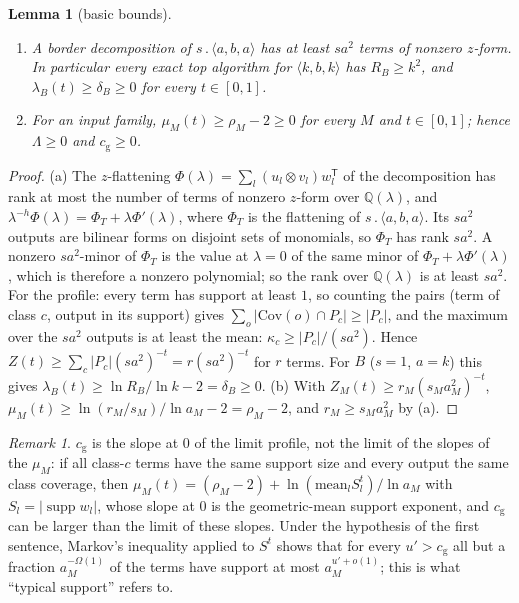 \documentclass[11pt]{article}
\newtheorem{lemma}[theorem]{Lemma}
\theoremstyle{definition}
\theoremstyle{remark}
\newtheorem{remark}[theorem]{Remark}
\providecommand{\Q}{\mathbb{Q}}
\newcommand{\abs}[1]{\lvert #1\rvert}
\DeclareMathOperator{\supp}{supp}
\newcommand{\mat}[3]{\langle #1,#2,#3\rangle} %
\newcommand{\cp}{\mathbin{.}}                 %
\newcommand{\Cov}{\mathrm{Cov}}               %
\newcommand{\lamB}{\lambda_B}                 %
\newcommand{\delB}{\delta_B}                  %
\newcommand{\RB}{R_B}                         %
\newcommand{\Lam}{\Lambda}                    %
\newcommand{\cg}{c_{\mathrm g}}               %
\begin{document}
\begin{lemma}[basic bounds]\label{cp:T1:basic}
\begin{enumerate}[label=(\alph*)]
\item A border decomposition of $s\cp\mat aba$ has at least $sa^2$ terms of nonzero $z$-form. In particular every exact top algorithm for $\mat kbk$ has $\RB\ge k^2$, and $\lamB(t)\ge\delB\ge0$ for every $t\in[0,1]$.
\item For an input family, $\mu_M(t)\ge\rho_M-2\ge0$ for every $M$ and $t\in[0,1]$; hence $\Lam\ge0$ and $\cg\ge0$.
\end{enumerate}
\end{lemma}

\begin{proof}
(a) The $z$-flattening $\Phi(\lambda)=\sum_l(u_l\otimes v_l)w_l^{\mathsf T}$ of the decomposition has rank at most the number of terms of nonzero $z$-form over $\Q(\lambda)$, and $\lambda^{-h}\Phi(\lambda)=\Phi_T+\lambda\Phi'(\lambda)$, where $\Phi_T$ is the flattening of $s\cp\mat aba$. Its $sa^2$ outputs are bilinear forms on disjoint sets of monomials, so $\Phi_T$ has rank $sa^2$. A nonzero $sa^2$-minor of $\Phi_T$ is the value at $\lambda=0$ of the same minor of $\Phi_T+\lambda\Phi'(\lambda)$, which is therefore a nonzero polynomial; so the rank over $\Q(\lambda)$ is at least $sa^2$.
For the profile: every term has support at least $1$, so counting the pairs (term of class $c$, output in its support) gives $\sum_o\abs{\Cov(o)\cap P_c}\ge\abs{P_c}$, and the maximum over the $sa^2$ outputs is at least the mean: $\kappa_c\ge\abs{P_c}/(sa^2)$. Hence $Z(t)\ge\sum_c\abs{P_c}(sa^2)^{-t}=r(sa^2)^{-t}$ for $r$ terms. For $B$ ($s=1$, $a=k$) this gives $\lamB(t)\ge\ln\RB/\ln k-2=\delB\ge0$.
(b) With $Z_M(t)\ge r_M(s_Ma_M^2)^{-t}$, $\mu_M(t)\ge\ln(r_M/s_M)/\ln a_M-2=\rho_M-2$, and $r_M\ge s_Ma_M^2$ by (a).
\end{proof}

\begin{remark}\label{cp:T1:rem}
$\cg$ is the slope at $0$ of the limit profile, not the limit of the slopes of the $\mu_M$: if all class-$c$ terms have the same support size and every output the same class coverage, then $\mu_M(t)=(\rho_M-2)+\ln(\mathrm{mean}_lS_l^t)/\ln a_M$ with $S_l=\abs{\supp w_l}$, whose slope at $0$ is the geometric-mean support exponent, and $\cg$ can be larger than the limit of these slopes. Under the hypothesis of the first sentence, Markov's inequality applied to $S^t$ shows that for every $u'>\cg$ all but a fraction $a_M^{-\Omega(1)}$ of the terms have support at most $a_M^{u'+o(1)}$; this is what ``typical support'' refers to.
\end{remark}
\end{document}
